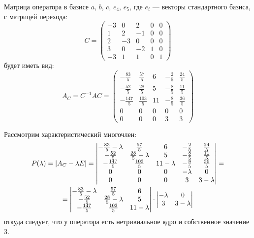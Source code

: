 \documentclass[12pt]{article}
\begin{document}
    Матрица оператора в базисе $a$, $b$, $c$, $e_4$, $e_5$, где $e_i$ --- векторы стандартного базиса, с матрицей перехода:
    \[
        C
        =
        \begin{pmatrix}
            -3 & 0  & 2  & 0 & 0 \\
            1  & 2  & -1 & 0 & 0 \\
            2  & -3 & 0  & 0 & 0 \\
            3  & 0  & -2 & 1 & 0 \\
            -3 & 1  & 1  & 0 & 1
        \end{pmatrix}
    \]
    будет иметь вид:
    \[
        A_C
        = C^{-1} A C
        =
        \begin{pmatrix}
            - \frac{83}{5}  & \frac{57}{5}  & 6  & - \frac{2}{5} & \frac{24}{5} \\
            - \frac{52}{5}  & \frac{28}{5}  & 5  & - \frac{8}{5} & \frac{11}{5} \\
            - \frac{147}{5} & \frac{103}{5} & 11 & - \frac{8}{5} & \frac{36}{5} \\
            0               & 0             & 0  & 0             & 0            \\
            0               & 0             & 0  & 3             & 3
        \end{pmatrix}
    \]

    Рассмотрим характеристический многочлен:
    \begin{multline*}
        P(\lambda)
        = \left | A_C - \lambda E \right |
        = \begin{vmatrix}
              - \frac{83}{5} - \lambda & \frac{57}{5}           & 6            & - \frac{2}{5} & \frac{24}{5} \\
              - \frac{52}{5}           & \frac{28}{5} - \lambda & 5            & - \frac{8}{5} & \frac{11}{5} \\
              - \frac{147}{5}          & \frac{103}{5}          & 11 - \lambda & - \frac{8}{5} & \frac{36}{5} \\
              0                        & 0                      & 0            & - \lambda     & 0            \\
              0                        & 0                      & 0            & 3             & 3 - \lambda
        \end{vmatrix} = \\
        =
        \begin{vmatrix}
            - \frac{83}{5} - \lambda & \frac{57}{5}           & 6            \\
            - \frac{52}{5}           & \frac{28}{5} - \lambda & 5            \\
            - \frac{147}{5}          & \frac{103}{5}          & 11 - \lambda
        \end{vmatrix}
        \cdot
        \begin{vmatrix}
            - \lambda & 0           \\
            3         & 3 - \lambda
        \end{vmatrix}
    \end{multline*}
    откуда следует, что у оператора есть нетривиальное ядро и собственное значение 3.
\end{document}
